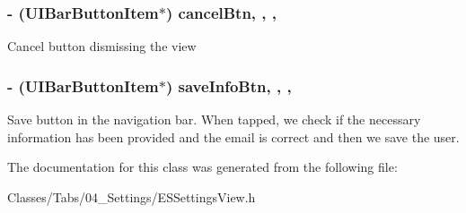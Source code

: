 \subsubsection[{cancel\+Btn}]{\setlength{\rightskip}{0pt plus 5cm}-\/ (U\+I\+Bar\+Button\+Item$\ast$) cancel\+Btn\hspace{0.3cm}{\ttfamily [read]}, {\ttfamily [write]}, {\ttfamily [nonatomic]}, {\ttfamily [strong]}}\label{interface_e_s_settings_view_a684344b5479173cd17a840aa208f556f}
Cancel button dismissing the view \hypertarget{interface_e_s_settings_view_a0f3b7fa2f2d2b97a0ef7b4cec79e4f08}{}
\subsubsection[{save\+Info\+Btn}]{\setlength{\rightskip}{0pt plus 5cm}-\/ (U\+I\+Bar\+Button\+Item$\ast$) save\+Info\+Btn\hspace{0.3cm}{\ttfamily [read]}, {\ttfamily [write]}, {\ttfamily [nonatomic]}, {\ttfamily [strong]}}\label{interface_e_s_settings_view_a0f3b7fa2f2d2b97a0ef7b4cec79e4f08}
Save button in the navigation bar. When tapped, we check if the necessary information has been provided and the email is correct and then we save the user. 

The documentation for this class was generated from the following file\+:\begin{DoxyCompactItemize}
\item 
Classes/\+Tabs/04\+\_\+\+Settings/E\+S\+Settings\+View.\+h\end{DoxyCompactItemize}
